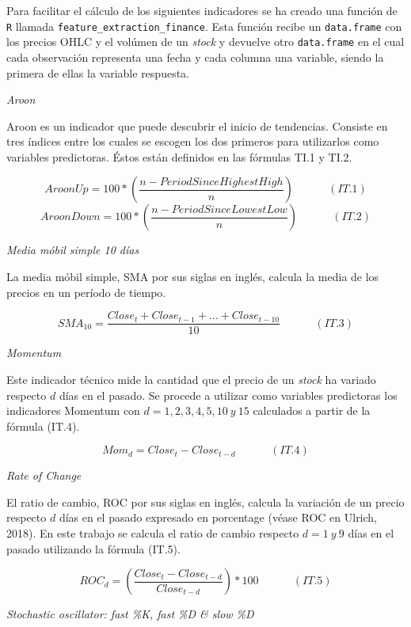 \documentclass[]{DissertateUSU}
\begin{document}
\setlength\parskip{7ex}

\noindent Para facilitar el cálculo de los siguientes indicadores se ha
creado una función de \texttt{R} llamada
\texttt{feature\_extraction\_finance}. Esta función recibe un
\texttt{data.frame} con los precios OHLC y el volúmen de un \emph{stock}
y devuelve otro \texttt{data.frame} en el cual cada observación
representa una fecha y cada columna una variable, siendo la primera de
ellas la variable respuesta.

\emph{Aroon}

\noindent Aroon es un indicador que puede descubrir el inicio de
tendencias. Consiste en tres índices entre los cuales se escogen los dos
primeros para utilizarlos como variables predictoras. Éstos están
definidos en las fórmulas TI.1 y TI.2.

\[ AroonUp = 100*(\frac{n-PeriodSinceHighestHigh}{n}) \ \ \ \ \ \ \ \ \ \ \ \ \ \ (IT.1)\]
\[ AroonDown = 100*(\frac{n-PeriodSinceLowestLow}{n}) \ \ \ \ \ \ \ \ \ \ \ \ \ \ (IT.2)\]

\emph{Media móbil simple 10 días}

\noindent La media móbil simple, SMA por sus siglas en inglés, calcula
la media de los precios en un período de tiempo.

\[ SMA_{10}=\frac{Close_t+Close_{t-1}+...+Close_{t-10}}{10} \ \ \ \ \ \ \ \ \ \ \ \ \ \ (IT.3)\]

\emph{Momentum}

\noindent Este indicador técnico mide la cantidad que el precio de un
\emph{stock} ha variado respecto \(d\) días en el pasado. Se procede a
utilizar como variables predictoras los indicadores Momentum con
\(d=1,2,3,4,5,10 \ y \ 15\) calculados a partir de la fórmula (IT.4).

\[Mom_d = Close_t - Close_{t-d} \ \ \ \ \ \ \ \ \ \ \ \ \ \ (IT.4)\]

\emph{Rate of Change}

\noindent El ratio de cambio, ROC por sus siglas en inglés, calcula la
variación de un precio respecto \(d\) días en el pasado expresado en
porcentage (véase ROC en Ulrich, 2018). En este trabajo se calcula el
ratio de cambio respecto \(d=1 \ y \ 9\) días en el pasado utilizando la
fórmula (IT.5).

\[ROC_d = (\frac{Close_t - Close_{t-d}}{Close_{t-d}})*100 \ \ \ \ \ \ \ \ \ \ \ \ \ \ (IT.5)\]

\emph{Stochastic oscillator: fast \%K, fast \%D \& slow \%D}
\end{document}
